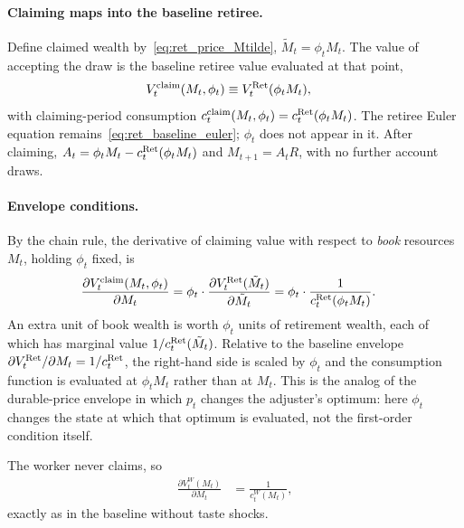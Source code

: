 \paragraph{Claiming maps into the baseline retiree.}
Define claimed wealth by~\eqref{eq:ret_price_Mtilde}, $\tilde M_t=\phi_t M_t$. The value of accepting the draw is the baseline retiree value evaluated at that point,
\begin{align}
	V_t^{\mathrm{claim}}(M_t,\phi_t)
	&\equiv V_t^{\mathrm{Ret}}(\phi_t M_t),
	\label{eq:ret_price_Vclaim}
\end{align}
with claiming-period consumption $c_t^{\mathrm{claim}}(M_t,\phi_t)=c_t^{\mathrm{Ret}}(\phi_t M_t)$. The retiree Euler equation remains~\eqref{eq:ret_baseline_euler}; $\phi_t$ does not appear in it. After claiming, $A_t=\phi_t M_t-c_t^{\mathrm{Ret}}(\phi_t M_t)$ and $M_{t+1}=A_t R$, with no further account draws.

\paragraph{Envelope conditions.}
By the chain rule, the derivative of claiming value with respect to \emph{book} resources $M_t$, holding $\phi_t$ fixed, is
\begin{align}
	\frac{\partial V_t^{\mathrm{claim}}(M_t,\phi_t)}{\partial M_t}
	&= \phi_t\cdot\frac{\partial V_t^{\mathrm{Ret}}(\tilde M_t)}{\partial\tilde M_t}
	= \phi_t\cdot\frac{1}{c_t^{\mathrm{Ret}}(\phi_t M_t)}.
	\label{eq:ret_price_env_Ret}
\end{align}
An extra unit of book wealth is worth $\phi_t$ units of retirement wealth, each of which has marginal value $1/c_t^{\mathrm{Ret}}(\tilde M_t)$. Relative to the baseline envelope $\partial V_t^{\mathrm{Ret}}/\partial M_t=1/c_t^{\mathrm{Ret}}$, the right-hand side is scaled by $\phi_t$ and the consumption function is evaluated at $\phi_t M_t$ rather than at $M_t$. This is the analog of the durable-price envelope in which $p_t$ changes the adjuster's optimum: here $\phi_t$ changes the state at which that optimum is evaluated, not the first-order condition itself.

The worker never claims, so
\begin{align}
	\frac{\partial V_t^{W}(M_t)}{\partial M_t}
	&= \frac{1}{c_t^{W}(M_t)},
	\label{eq:ret_price_env_W}
\end{align}
exactly as in the baseline without taste shocks.

